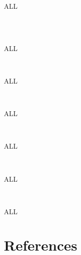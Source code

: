 \begin{syntax}
  ALL
  \begin{1=}
     \\
     \\
  \end{1=}
\end{syntax}

\begin{syntax}
  ALL
  \begin{1=}
     \\
  \end{1=}
\end{syntax}

\begin{syntax}
  ALL
  \begin{1=}
     \\
  \end{1=}
\end{syntax}

\begin{syntax}
  ALL
  \begin{1=}
     \\
  \end{1=}
\end{syntax}

\begin{syntax}
  ALL
  \begin{1=}
     \\
  \end{1=}
\end{syntax}

\begin{syntax}[\miscextcolour]
  ALL
  \begin{1=}
     \\
  \end{1=}
\end{syntax}

\begin{syntax}
   \literal
\end{syntax}

\begin{syntax}
  ALL \symboliccharacter
\end{syntax}

\section{References}

